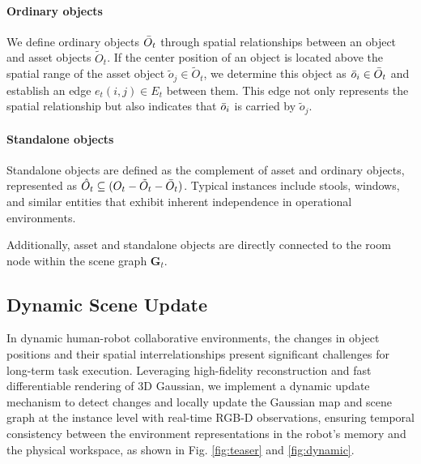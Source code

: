 
\paragraph{Ordinary objects}
\label{para:ordinary_layer}
We define ordinary objects $\Bar{O}_t$ through spatial relationships between an object and asset objects $\tilde{O}_{t}$. If the center position of an object is located above the spatial range of the asset object $\tilde{o}_{j} \in \tilde{O}_{t}$, we determine this object as $\Bar{o}_{i} \in \Bar{O}_t$ and  establish an edge $e_t(i,j) \in E_t$ between them. This edge not only represents the spatial relationship but also indicates that $\Bar{o}_{i}$ is carried by $\tilde{o}_{j}$.

\paragraph{Standalone objects}
\label{para:standalone_layer}
Standalone objects are defined as the complement of asset and ordinary objects, represented as $\hat{O}_t \subseteq (O_t-\tilde{O}_t - \Bar{O}_t)$. Typical instances include stools, windows, and similar entities that exhibit inherent independence in operational environments.

Additionally, asset and standalone objects are directly connected to the room node within the scene graph $\textbf{G}_t$.

\subsection{Dynamic Scene Update}
\label{para:dynamic_update}

In dynamic human-robot collaborative environments, the changes in object positions and their spatial interrelationships present significant challenges for long-term task execution. Leveraging high-fidelity reconstruction and fast differentiable rendering of 3D Gaussian, we implement a dynamic update mechanism to detect changes and locally update the Gaussian map and scene graph at the instance level with real-time RGB-D observations, ensuring temporal consistency between the environment representations in the robot's memory and the physical workspace, as shown in Fig. \ref{fig:teaser} and \ref{fig:dynamic}.

